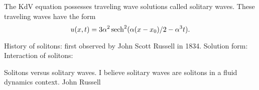The KdV equation possesses traveling wave solutions called solitary waves. These traveling waves have the form 
\[ u(x,t) = 3\alpha^2 \operatorname{sech}^2(\alpha(x-x_0)/2 - \alpha^3 t).
\]

History of solitons: first observed by John Scott Russell in 1834. 
Solution form:  
Interaction of solitons: 

Solitons versus solitary waves. I believe solitary waves are solitons in a fluid dynamics context. 
John Russell 




















